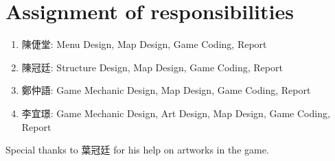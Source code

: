\section{Assignment of responsibilities}
\begin{enumerate}
	    \item 陳倢堂: Menu Design, Map Design, Game Coding, Report
    \item 陳冠廷: Structure Design, Map Design, Game Coding, Report
    \item 鄭仲語: Game Mechanic Design, Map Design, Game Coding, Report
    \item 李宜璟: Game Mechanic Design, Art Design, Map Design, Game Coding, Report
\end{enumerate}

Special thanks to 葉冠廷 for his help on artworks in the game.